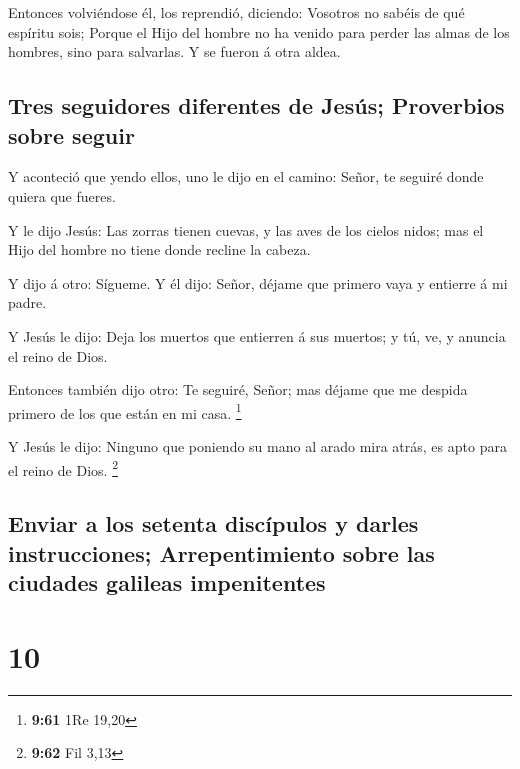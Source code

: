  Entonces volviéndose él, los reprendió, diciendo:
Vosotros no sabéis de qué espíritu sois;  Porque el Hijo
del hombre no ha venido para perder las almas de los hombres, sino para
salvarlas. Y se fueron á otra aldea.

\hypertarget{tres-seguidores-diferentes-de-jesuxfas-proverbios-sobre-seguir}{%
\subsection{Tres seguidores diferentes de Jesús; Proverbios sobre
seguir}\label{tres-seguidores-diferentes-de-jesuxfas-proverbios-sobre-seguir}}

 Y aconteció que yendo ellos, uno le dijo en el camino:
Señor, te seguiré donde quiera que fueres.

 Y le dijo Jesús: Las zorras tienen cuevas, y las aves de
los cielos nidos; mas el Hijo del hombre no tiene donde recline la
cabeza.

 Y dijo á otro: Sígueme. Y él dijo: Señor, déjame que
primero vaya y entierre á mi padre.

 Y Jesús le dijo: Deja los muertos que entierren á sus
muertos; y tú, ve, y anuncia el reino de Dios.

 Entonces también dijo otro: Te seguiré, Señor; mas
déjame que me despida primero de los que están en mi casa. \footnote{\textbf{9:61}
  1Re 19,20}

 Y Jesús le dijo: Ninguno que poniendo su mano al arado
mira atrás, es apto para el reino de Dios. \footnote{\textbf{9:62} Fil
  3,13}

\hypertarget{enviar-a-los-setenta-discuxedpulos-y-darles-instrucciones-arrepentimiento-sobre-las-ciudades-galileas-impenitentes}{%
\subsection{Enviar a los setenta discípulos y darles instrucciones;
Arrepentimiento sobre las ciudades galileas
impenitentes}\label{enviar-a-los-setenta-discuxedpulos-y-darles-instrucciones-arrepentimiento-sobre-las-ciudades-galileas-impenitentes}}

\hypertarget{section-9}{%
\section{10}\label{section-9}}

